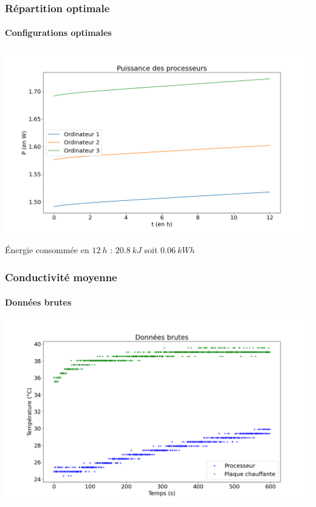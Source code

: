 \documentclass[a4paper,11pt]{beamer}
\begin{document}
\begin{frame}
    \frametitle{Répartition optimale}
    \framesubtitle{Configurations optimales}

    \includegraphics[width=\textwidth]{min_puissance.png}

    \begin{center}
        Énergie consommée en $\SI{12}{h}$ : $\SI{20,8}{kJ}$ soit $\SI{0.06}{kWh}$
    \end{center}
\end{frame}

\begin{frame}
    \frametitle{Conductivité moyenne}
    \framesubtitle{Données brutes}

    \includegraphics[width=\textwidth]{donnees_brutes.png}
\end{frame}
\end{document}
